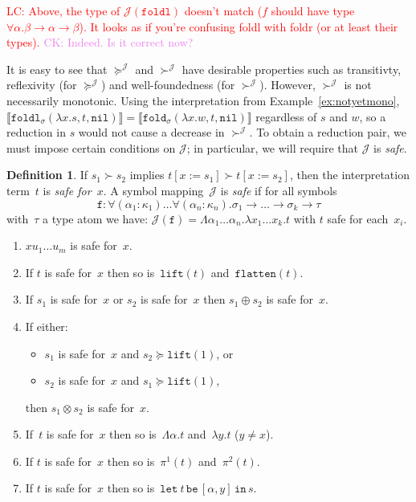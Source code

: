 \documentclass[a4paper,UKenglish,cleveref,autoref,numberwithinsect]{lipics-v2019}
\theoremstyle{definition}
\newtheorem{defn}[theorem]{Definition}
\newcommand{\arrtype}{\rightarrow}
\newcommand{\subst}[2]{#1:=#2}
\newcommand{\abs}[2]{\lambda #1.#2}
\newcommand{\tabs}[2]{\Lambda #1.#2}
\newcommand{\flatten}{\mathtt{flatten}}
\newcommand{\lift}{\mathtt{lift}}
\newcommand{\interpret}[1]{\llbracket #1 \rrbracket}
\newcommand{\Termmap}{\mathcal{J}}
\newcommand{\succinterpret}{\succ^{\Termmap}}
\newcommand{\succeqinterpret}{\succeq^{\Termmap}}
\newcommand{\nil}{\mathtt{nil}}
\newcommand{\xlet}[4]{\mathtt{let}_{#1}\,#2\,\mathtt{be}\,[#3]\,\mathtt{in}\,#4}
\newcommand{\CK}[1]{\textcolor{violet}{CK: #1}}
\newcommand{\LC}[1]{\textcolor{red}{LC: #1}}
\begin{document}
\LC{Above, the type of $\Termmap(\mathtt{foldl})$ doesn't match ($f$ should
  have type $\forall \alpha . \beta \to \alpha \to \beta$). It looks
  as if you're confusing foldl with foldr (or at least their types).}
\CK{Indeed. Is it correct now?}

It is easy to see that $\succeqinterpret$ and
$\succinterpret$ have desirable properties such as transitivty,
reflexivity (for $\succeqinterpret$) and well-foundedness (for
$\succinterpret$).  However, $\succinterpret$ is not necessarily
monotonic.  Using the interpretation from Example~\ref{ex:notyetmono},
$\interpret{\mathtt{foldl}_{\sigma}(\abs{x}{s},t,\nil)} =
\interpret{\mathtt{fold}_{\sigma}(\abs{x}{w},t,\nil)}$ regardless of
$s$ and $w$, so a reduction in $s$ would not cause a decrease in
$\succinterpret$.  To obtain a reduction pair, we must impose certain
conditions on $\Termmap$; in particular, we will require that
$\Termmap$ is \emph{safe}.

\begin{defn}\label{def_safe}
  If $s_1 \succ s_2$ implies $t[\subst{x}{s_1}] \succ
  t[\subst{x}{s_2}]$, then the interpretation term~$t$ is \emph{safe
    for~$x$}. A symbol mapping~$\Termmap$ is \emph{safe} if for all
  symbols
  \[
  \mathtt{f} : \forall (\alpha_1 : \kappa_1) \ldots \forall (\alpha_n
  : \kappa_n) . \sigma_1 \arrtype \ldots \arrtype \sigma_k \arrtype
  \tau
  \]
  with~$\tau$ a type atom we have: $\Termmap(\mathtt{f}) =
  \tabs{\alpha_1 \dots \alpha_n}{\abs{x_1 \dots x_k}{t}}$ with $t$
  safe for each~$x_i$.
\end{defn}

\begin{lemma}\label{lem_safe}
  \begin{enumerate}
  \item $x u_1 \ldots u_m$ is safe for~$x$.
  \item If $t$ is safe for~$x$ then so is~$\lift(t)$
    and~$\flatten(t)$.
  \item If $s_1$ is safe for~$x$ or $s_2$ is safe for~$x$ then $s_1
    \oplus s_2$ is safe for~$x$.
  \item If either:
    \begin{itemize}
    \item $s_1$ is safe for~$x$ and $s_2 \succeq \lift(1)$, or
    \item $s_2$ is safe for~$x$ and $s_1 \succeq \lift(1)$,
    \end{itemize}
    then $s_1 \otimes s_2$ is safe for~$x$.
  \item If~$t$ is safe for~$x$ then so is~$\tabs{\alpha}{t}$
    and~$\abs{y}{t}$ ($y \ne x$).
  \item If $t$ is safe for~$x$ then so is~$\pi^1(t)$ and~$\pi^2(t)$.
  \item If $t$ is safe for~$x$ then so is~$\xlet{}{t}{\alpha,y}{s}$.
  \end{enumerate}
\end{lemma}
\end{document}
